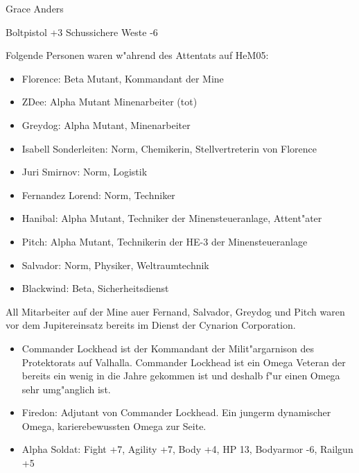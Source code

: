 \begin{nscsheet}{Grace Anders}
    \nscstats[ATT=4,AGG=3,EMP=4,KNO=3,HP=10]
    \nscruler
    \begin{nscinventory}
        \nscitem[Waffen] Boltpistol +3
        \nscitem[R"ustung] Schussichere Weste -6
    \end{nscinventory}
\end{nscsheet}



Folgende Personen waren w"ahrend des Attentats auf HeM05:

\begin{itemize}
    \item Florence: Beta Mutant, Kommandant der Mine    
    \item ZDee: Alpha Mutant Minenarbeiter (tot)
    \item Greydog: Alpha Mutant, Minenarbeiter
    \item Isabell Sonderleiten: Norm, Chemikerin, Stellvertreterin von Florence
    \item Juri Smirnov: Norm, Logistik
    \item Fernandez Lorend: Norm, Techniker
    \item Hanibal: Alpha Mutant, Techniker der Minensteueranlage, Attent"ater
    \item Pitch: Alpha Mutant, Technikerin der HE-3 der Minensteueranlage
    \item Salvador: Norm, Physiker, Weltraumtechnik
    \item Blackwind: Beta, Sicherheitsdienst
\end{itemize}

All Mitarbeiter auf der Mine au\3er Fernand, Salvador, Greydog und Pitch waren vor dem Jupitereinsatz bereits im Dienst der Cynarion Corporation.


\begin{itemize}
    \item Commander Lockhead ist der Kommandant der Milit"argarnison des Protektorats auf Valhalla. Commander Lockhead ist ein Omega Veteran der bereits ein wenig in die Jahre gekommen ist und deshalb f"ur einen Omega sehr umg"anglich ist. 
    \item Firedon: Adjutant von Commander Lockhead. Ein jungerm dynamischer Omega, karierebewussten Omega zur Seite.
    \item Alpha Soldat: Fight +7, Agility +7, Body +4, HP 13, Bodyarmor -6, Railgun +5
\end{itemize}

